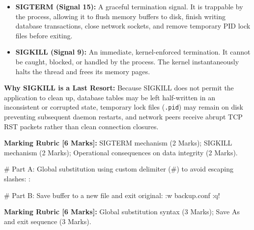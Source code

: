 \begin{examsol}
\begin{itemize}[leftmargin=1.5em]
    \item \textbf{SIGTERM (Signal 15):} A graceful termination signal. It is trappable by the process, allowing it to flush memory buffers to disk, finish writing database transactions, close network sockets, and remove temporary PID lock files before exiting.
    \item \textbf{SIGKILL (Signal 9):} An immediate, kernel-enforced termination. It cannot be caught, blocked, or handled by the process. The kernel instantaneously halts the thread and frees its memory pages.
\end{itemize}
\textbf{Why SIGKILL is a Last Resort:} Because SIGKILL does not permit the application to clean up, database tables may be left half-written in an inconsistent or corrupted state, temporary lock files (\texttt{.pid}) may remain on disk preventing subsequent daemon restarts, and network peers receive abrupt TCP RST packets rather than clean connection closures.

\begin{markingrubric}
\textbf{Marking Rubric [6 Marks]:} SIGTERM mechanism (2 Marks); SIGKILL mechanism (2 Marks); Operational consequences on data integrity (2 Marks).
\end{markingrubric}
\end{examsol}


\begin{examsol}
\begin{examcli}
# Part A: Global substitution using custom delimiter (#) to avoid escaping slashes:
:%

# Part B: Save buffer to a new file and exit original:
:w backup.conf
:q!
\end{examcli}

\begin{markingrubric}
\textbf{Marking Rubric [6 Marks]:} Global substitution syntax (3 Marks); Save As and exit sequence (3 Marks).
\end{markingrubric}
\end{examsol}


